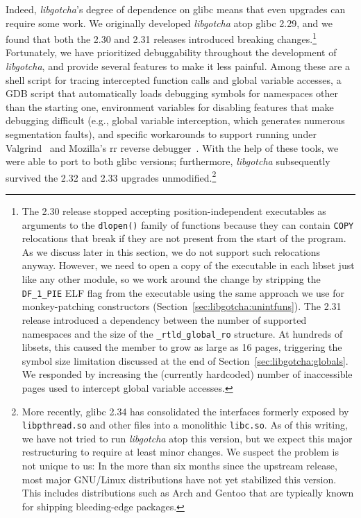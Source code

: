 Indeed, \textit{libgotcha}'s degree of dependence on glibc means that even upgrades
can require some
work.  We originally developed \textit{libgotcha} atop glibc 2.29, and we found that
both the 2.30 and 2.31 releases introduced breaking changes.\footnote{The 2.30
release stopped accepting position-independent executables as arguments to the
\texttt{dlopen()} family of functions because they can contain \texttt{COPY}
relocations that break if they are not present from the start of the program.  As we
discuss later in this section, we do not support such relocations anyway.  However,
we need to open a copy of the executable in each libset just like any other module,
so we work around the change by stripping the \texttt{DF\_1\_PIE} ELF flag from the
executable using the same approach we use for monkey-patching constructors
(Section~\ref{sec:libgotcha:unintfuns}).  The 2.31 release introduced a dependency
between the number of supported namespaces and the size of the
\texttt{\_rtld\_global\_ro} structure.  At hundreds of libsets, this caused the
member to grow as large as 16 pages, triggering the symbol size limitation discussed
at the end of Section~\ref{sec:libgotcha:globals}.  We responded by increasing the
(currently hardcoded) number of inaccessible pages used to intercept global variable
accesses.}  Fortunately, we have prioritized debuggability throughout the development
of \textit{libgotcha}, and provide several features to make it less painful.  Among
these are a shell script for tracing intercepted function calls and global variable
accesses, a GDB script that automatically loads debugging symbols for namespaces
other than the starting one, environment variables for disabling features that make
debugging difficult (e.g., global variable interception, which generates numerous
segmentation faults), and specific workarounds to support running under
Valgrind~\cite{seward:usenix2005} and Mozilla's rr reverse
debugger~\cite{callahan:arxiv2017}.  With the help of these tools, we were able to
port to both glibc versions; furthermore, \textit{libgotcha} subsequently survived
the 2.32 and 2.33 upgrades unmodified.\footnote{More recently, glibc 2.34 has
consolidated the interfaces formerly exposed by \texttt{libpthread.so} and other
files into a monolithic \texttt{libc.so}.  As of this writing, we have not tried to
run \textit{libgotcha} atop this version, but we expect this major restructuring to
require at least minor changes.  We suspect the problem is not unique to us:  In the
more than six months since the upstream release, most major GNU/Linux distributions
have not yet stabilized this version.  This includes distributions such as Arch and
Gentoo that are typically known for shipping bleeding-edge packages.}


